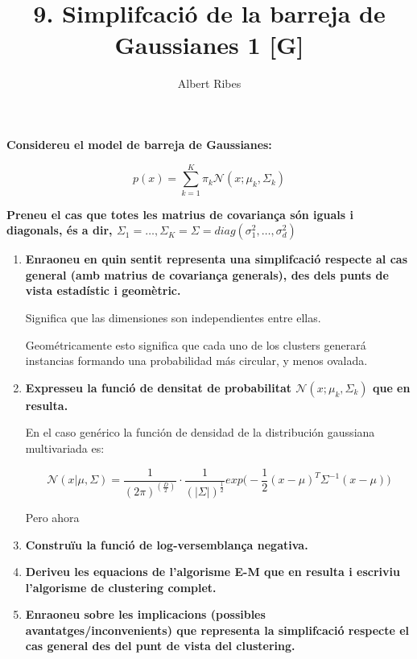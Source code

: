 \documentclass[a4paper,10pt]{article}
\title{9. Simplifcació de la barreja de Gaussianes 1 [G]}
\author{Albert Ribes}
\begin{document}
\maketitle

%


\textbf{
Considereu el model de barreja de Gaussianes:
}

\begin{equation*}
p(x) = \sum_{k = 1}^{K} \pi_k \mathcal{N}(x; \mu_k, \Sigma_k)
\end{equation*}

\textbf{
Preneu el cas que totes les matrius de covariança són iguals i diagonals, és a dir, $\Sigma_1 = \dots, \Sigma_K = \Sigma = diag(\sigma_1^2,\dots, \sigma_d^2)$
}

\begin{enumerate}
\item \textbf{Enraoneu en quin sentit representa una simplifcació respecte al cas general (amb matrius de
covariança generals), des dels punts de vista estadístic i geomètric.
}

Significa que las dimensiones son independientes entre ellas.

Geométricamente esto significa que cada uno de los clusters generará instancias formando una probabilidad más circular, y menos ovalada.
\item \textbf{Expresseu la funció de densitat de probabilitat $\mathcal{N}(x; \mu_k, \Sigma_k)$ que en resulta.
}

En el caso genérico la función de densidad de la distribución gaussiana multivariada es:

\begin{equation*}
\mathcal{N}(x|\mu,\Sigma) = \frac{1}{(2\pi)^{(\frac{D}{2})}} \cdot \frac{1}{(|\Sigma|)^{\frac{1}{2}}} exp\Bigg( -\frac{1}{2} (x - \mu)^T\Sigma^{-1}(x - \mu) \Bigg)
\end{equation*}

Pero ahora
\item \textbf{Construïu la funció de log-versemblança negativa.
}
\item \textbf{Deriveu les equacions de l'algorisme E-M que en resulta i escriviu l'algorisme de clustering complet.
}
\item \textbf{Enraoneu sobre les implicacions (possibles avantatges/inconvenients) que representa la simplifcació
respecte el cas general des del punt de vista del clustering.
}
\end{enumerate}
\end{document}
